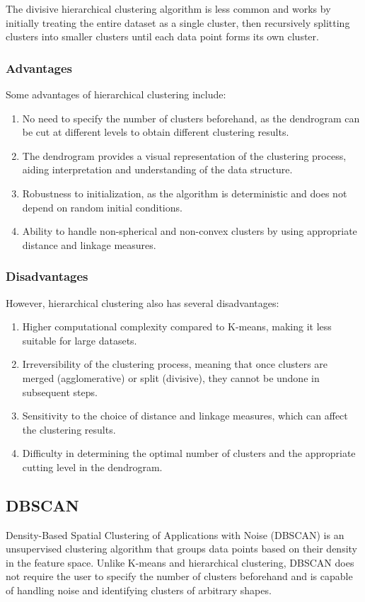 \documentclass[12pt]{article}
\begin{document}
The divisive hierarchical clustering algorithm is less common and works by initially treating the entire dataset as a single cluster, then recursively splitting clusters into smaller clusters until each data point forms its own cluster.

\subsubsection{Advantages}
Some advantages of hierarchical clustering include:
\begin{enumerate}
\item No need to specify the number of clusters beforehand, as the dendrogram can be cut at different levels to obtain different clustering results.
\item The dendrogram provides a visual representation of the clustering process, aiding interpretation and understanding of the data structure.
\item Robustness to initialization, as the algorithm is deterministic and does not depend on random initial conditions.
\item Ability to handle non-spherical and non-convex clusters by using appropriate distance and linkage measures.
\end{enumerate}

\subsubsection{Disadvantages}
However, hierarchical clustering also has several disadvantages:
\begin{enumerate}
\item Higher computational complexity compared to K-means, making it less suitable for large datasets.
\item Irreversibility of the clustering process, meaning that once clusters are merged (agglomerative) or split (divisive), they cannot be undone in subsequent steps.
\item Sensitivity to the choice of distance and linkage measures, which can affect the clustering results.
\item Difficulty in determining the optimal number of clusters and the appropriate cutting level in the dendrogram.
\end{enumerate}

\subsection{DBSCAN}
Density-Based Spatial Clustering of Applications with Noise (DBSCAN) is an unsupervised clustering algorithm that groups data points based on their density in the feature space. Unlike K-means and hierarchical clustering, DBSCAN does not require the user to specify the number of clusters beforehand and is capable of handling noise and identifying clusters of arbitrary shapes.
\end{document}

